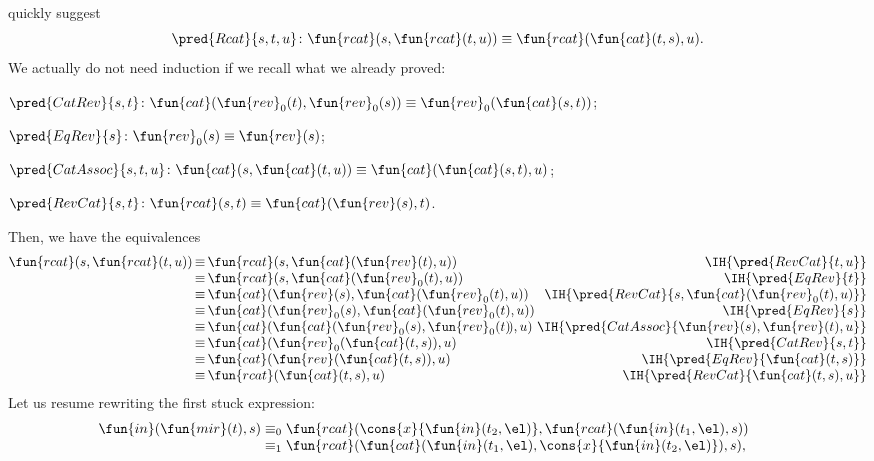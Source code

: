 quickly suggest
\begin{equation*}
  \pred{Rcat}{s,t,u} \colon \fun{rcat}(s,\fun{rcat}(t,u)) \equiv \fun{rcat}(\fun{cat}(t,s),u).
\end{equation*}
We actually do not need induction if we recall what we already proved:
\begin{itemize*}

  \item \(\pred{CatRev}{s,t} \colon \fun{cat}(\fun{rev}_0(t),
    \fun{rev}_0(s)) \equiv \fun{rev}_0(\fun{cat}(s,t))\);

  \item \(\pred{EqRev}{s} \colon \fun{rev}_0(s) \equiv \fun{rev}(s)\);

  \item \(\pred{CatAssoc}{s,t,u} \colon \fun{cat}(s,\fun{cat}(t,u))
    \equiv \fun{cat}(\fun{cat}(s,t),u)\);

  \item \(\pred{RevCat}{s,t} \colon \fun{rcat}(s,t) \equiv
    \fun{cat}(\fun{rev}(s),t)\).

\end{itemize*}
Then, we have the equivalences
\begin{equation*}
\begin{array}{@{}r@{\,}c@{\,}l@{\,}r@{}}
\fun{rcat}(s,\fun{rcat}(t,u))
& \equiv & \fun{rcat}(s,\fun{cat}(\fun{rev}(t),u))
& \IH{\pred{RevCat}{t,u}}\\
& \equiv & \fun{rcat}(s,\fun{cat}(\fun{rev}_0(t),u))
& \IH{\pred{EqRev}{t}}\\
& \equiv & \fun{cat}(\fun{rev}(s),\fun{cat}(\fun{rev}_0(t),u))
& \IH{\pred{RevCat}{s,\fun{cat}(\fun{rev}_0(t),u)}}\\
& \equiv & \fun{cat}(\fun{rev}_0(s),\fun{cat}(\fun{rev}_0(t),u))
& \IH{\pred{EqRev}{s}}\\
& \equiv & \fun{cat}(\fun{cat}(\fun{rev}_0(s),\fun{rev}_0(t)\!),u)
& \IH{\pred{CatAssoc}{\fun{rev}(s),\fun{rev}(t),u}}\\
& \equiv & \fun{cat}(\fun{rev}_0(\fun{cat}(t,s)),u)
& \IH{\pred{CatRev}{s,t}}\\
& \equiv & \fun{cat}(\fun{rev}(\fun{cat}(t,s)),u)
& \IH{\pred{EqRev}{\fun{cat}(t,s)}}\\
& \equiv & \fun{rcat}(\fun{cat}(t,s),u)
& \IH{\pred{RevCat}{\fun{cat}(t,s),u}}
\end{array}
\end{equation*}
Let us resume rewriting the first stuck expression:
\begin{equation*}
\begin{array}{@{}r@{\;}c@{\;}l@{\qquad}r@{}}
\fun{in}(\fun{mir}(t),s)
& \equiv_0
& \fun{rcat}(\cons{x}{\fun{in}(t_2,\el)},
  \fun{rcat}(\fun{in}(t_1,\el),s))\\
& \equiv_1
& \fun{rcat}(\fun{cat}(\fun{in}(t_1,\el),
  \cons{x}{\fun{in}(t_2,\el)}), s),\index{rcat@\fun{rcat/2}|)}
\end{array}
\end{equation*}
